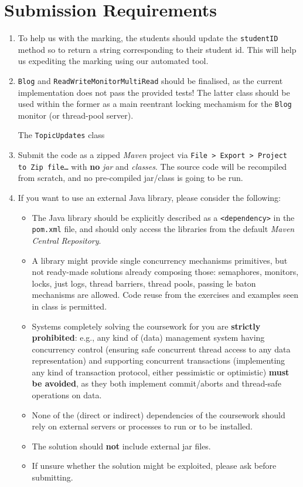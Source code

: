 \documentclass{article}
\begin{document}
	\section*{Submission Requirements}
	\begin{enumerate}
\item To help us with the marking, the students should update the \texttt{studentID} method so to return a string corresponding to their student id. This will help us expediting the marking using our automated tool.
		\item \texttt{Blog} and \texttt{ReadWriteMonitorMultiRead} should be finalised, as the current implementation does not pass the provided tests! The latter class should be used within the former as a main reentrant locking mechamism for the \texttt{Blog} monitor (or thread-pool server). 

The \texttt{TopicUpdates} class 
		\item Submit the code as a zipped \textit{Maven} project via \texttt{File > Export > Project to Zip file\dots} with \textbf{no} \textit{jar} and \textit{classes}. The source code will be recompiled from scratch, and no pre-compiled jar/class is going to be run.
		 
		\item If you want to use an external Java library, please consider the following:
		\begin{itemize}
			\item The Java library should be explicitly described as a \texttt{<dependency>} in the \texttt{pom.xml} file, and should only access the libraries from the default \textit{Maven Central Repository}.
			\item A library might provide single concurrency mechanisms primitives, but not ready-made solutions already composing those: semaphores, monitors, locks, just logs, thread barriers, thread pools, passing le baton mechanisms are allowed. Code reuse from the exercises and examples seen in class is permitted.
			
			\item Systems completely solving the coursework for you are \textbf{strictly prohibited}: e.g., any kind of (data) management system having concurrency control (ensuring safe concurrent thread access to any data representation) and supporting concurrent transactions (implementing any kind of transaction protocol, either pessimistic or optimistic) \textbf{must be avoided}, as they both implement commit/aborts and thread-safe operations on data. 
			\item None of the (direct or indirect) dependencies of the coursework should rely on external servers or processes to run or to be installed.
			\item The solution should \textbf{not} include external jar files.
			\item If unsure whether the solution might be exploited, please ask before submitting.
		\end{itemize}
		 

\end{enumerate}
\end{document}
